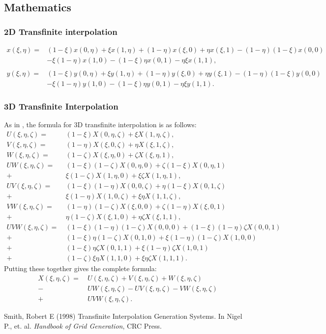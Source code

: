 \documentclass{article}
\newcommand{\ba}[1]{\begin{align*}    #1    \end{align*}}
\begin{document}
\subsection{Mathematics}
\label{sec:Mathematics}

\subsubsection{2D Transfinite interpolation}
\label{sec:2Dtfi}

\ba{
x(\xi,\eta) = &(1-\xi)x(0,\eta)+\xi x(1,\eta)+(1-\eta)x(\xi,0)+\eta x(\xi,1)-(1-\eta)(1-\xi)x(0,0)
\\&-\xi(1-\eta)x(1,0)-(1-\xi)\eta x(0,1)-\eta \xi x(1,1),\\
\\y(\xi, \eta) = &(1-\xi)y(0,\eta)+\xi y(1,\eta)+(1-\eta)y(\xi,0)+\eta y(\xi,1)-(1-\eta)(1-\xi)y(0,0)
\\&-\xi(1-\eta)y(1,0)-(1-\xi)\eta y(0,1)-\eta \xi y(1,1).
}

\subsubsection{3D Transfinite Interpolation}
\label{sec:3Dtfi}

As in \cite{smith}, the formula for 3D transfinite interpolation is as follows:
\ba{
U(\xi, \eta, \zeta) = & \ (1-\xi)X(0,\eta, \zeta) + \xi X(1,\eta, \zeta), \\
V(\xi, \eta, \zeta) = & \ (1-\eta)X(\xi, 0, \zeta) + \eta X(\xi, 1, \zeta), \\
W(\xi, \eta, \zeta) = & \ (1-\zeta)X(\xi, \eta, 0) + \zeta X(\xi, \eta, 1), \\
UW(\xi, \eta, \zeta) = & \ (1-\xi)(1-\zeta) X(0, \eta, 0) + \zeta (1-\xi) X(0, \eta, 1)  \\
+ & \ \xi (1-\zeta) X(1,\eta, 0) + \xi \zeta X(1, \eta, 1), \\
UV(\xi, \eta, \zeta) = & \ (1-\xi)(1-\eta)X(0,0,\zeta) + \eta (1-\xi) X(0,1,\zeta)  \\
+ & \ \xi (1-\eta) X(1,0,\zeta) + \xi \eta X(1,1,\zeta), \\
VW(\xi, \eta, \zeta) = & \ (1-\eta)(1-\zeta)X(\xi,0,0) + \zeta (1-\eta) X(\xi, 0, 1)  \\
+ & \ \eta (1-\zeta) X(\xi, 1, 0) + \eta \zeta X(\xi, 1,1),  \\
UVW(\xi, \eta, \zeta) = & \ (1-\xi)(1-\eta)(1-\zeta)X(0,0,0) + (1-\xi)(1-\eta) \zeta X(0,0,1)  \\
+ & \ (1-\xi) \eta (1-\zeta) X(0,1,0) + \xi (1-\eta)(1- \zeta) X(1,0,0) \\
+ & \ (1-\xi) \eta \zeta X(0,1,1) + \xi (1-\eta) \zeta X(1,0,1) \\
+ & \ (1-\zeta) \xi \eta  X(1,1,0) + \xi \eta \zeta  X(1,1,1).
}
Putting these together gives the complete formula:
\ba{
X(\xi, \eta, \zeta) = & \  U(\xi, \eta, \zeta) + V(\xi, \eta, \zeta) + W(\xi, \eta, \zeta) \\
 - & \ UW(\xi, \eta, \zeta) - UV(\xi, \eta, \zeta) - VW(\xi, \eta, \zeta) \\
 + & \  UVW(\xi, \eta, \zeta).
}


\begin{thebibliography}{}
 Smith, Robert E (1998) Transfinite Interpolation Generation Systems. In Nigel P., et. al. {\it Handbook of Grid Generation}, CRC Press.
\end{thebibliography}
\end{document}
